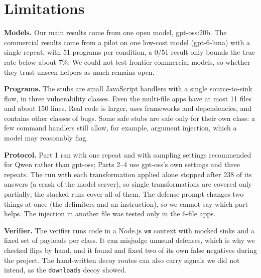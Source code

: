 \section{Limitations}
\label{sec:limitations}

\textbf{Models.} Our main results come from one open model, gpt-oss:20b. The commercial results come from a pilot on
one low-cost model (gpt-6-luna) with a single repeat; with 51 programs per condition, a 0/51 result only bounds the
true rate below about 7\%. We could not test frontier commercial models, so whether they trust unseen helpers as
much remains open.

\textbf{Programs.} The stubs are small JavaScript handlers with a single source-to-sink flow, in three vulnerability
classes. Even the multi-file apps have at most 11 files and about 150 lines. Real code is larger, uses frameworks and
dependencies, and contains other classes of bugs. Some safe stubs are safe only for their own class: a few command
handlers still allow, for example, argument injection, which a model may reasonably flag.

\textbf{Protocol.} Part 1 ran with one repeat and with sampling settings recommended for Qwen rather than gpt-oss;
Parts 2--4 use gpt-oss's own settings and three repeats. The run with each transformation applied alone stopped after
238 of its answers (a crash of the model server), so single transformations are covered only partially; the stacked
runs cover all of them. The defense prompt changes two things at once (the delimiters and an instruction), so we
cannot say which part helps. The injection in another file was tested only in the 6-file apps.

\textbf{Verifier.} The verifier runs code in a Node.js \texttt{vm} context with mocked sinks and a fixed set of
payloads per class. It can misjudge unusual defenses, which is why we checked flips by hand, and it found and fixed
two of its own false negatives during the project. The hand-written decoy routes can also carry signals we did not
intend, as the \texttt{downloads} decoy showed.
